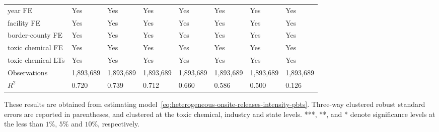 \begin{table}[H]
{\begin{tabular}{@{}llllllll@{}}
            year FE                         & Yes       & Yes           & Yes       & Yes          & Yes             & Yes           & Yes                 \\
            facility FE                     & Yes       & Yes           & Yes       & Yes          & Yes             & Yes           & Yes                 \\
            border-county FE                & Yes       & Yes           & Yes       & Yes          & Yes             & Yes           & Yes                 \\
            toxic chemical FE               & Yes       & Yes           & Yes       & Yes          & Yes             & Yes           & Yes                 \\
            toxic chemical LTs              & Yes       & Yes           & Yes       & Yes          & Yes             & Yes           & Yes                 \\\midrule
            Observations                    & 1,893,689 & 1,893,689     & 1,893,689 & 1,893,689    & 1,893,689       & 1,893,689     & 1,893,689           \\
            $R^2$                           & 0.720     & 0.739         & 0.712     & 0.660        & 0.586           & 0.500         & 0.126               \\ \bottomrule\bottomrule
        \end{tabular}%
    }
    \begin{minipage}{18cm}
        \vspace{0.05in}
        These results are obtained from estimating model~\ref{eq:heterogeneous-onsite-releases-intensity-pbts}. Three-way clustered robust standard errors are reported in parentheses, and clustered at the toxic chemical, industry and state levels. ***, **, and * denote significance levels at the less than $1\%$, $5\%$ and $10\%$, respectively.
    \end{minipage}
\end{table}